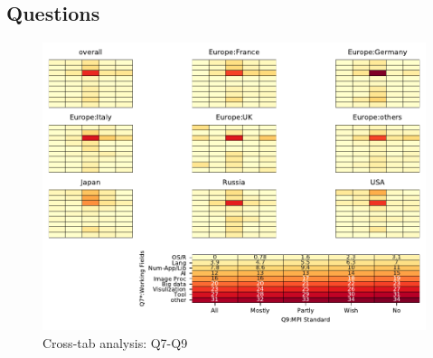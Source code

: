 
\subsection{Questions}


\begin{figure}
\begin{center}
\includegraphics[width=12cm]{../pdfs/Q7-Q9.pdf}
\caption{Cross-tab analysis: Q7-Q9}
\label{fig:Q7-Q9}
\end{center}
\end{figure}
